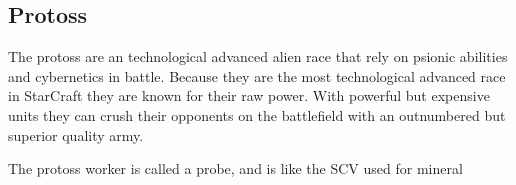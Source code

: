 \subsection{Protoss}
The protoss are an technological advanced alien race that rely on psionic abilities and cybernetics in battle. Because they are the most technological advanced race in StarCraft they are known for their raw power. With powerful but expensive units they can crush their opponents on the battlefield with an outnumbered but superior quality army.

The protoss worker is called a probe, and is like the SCV used for mineral 

